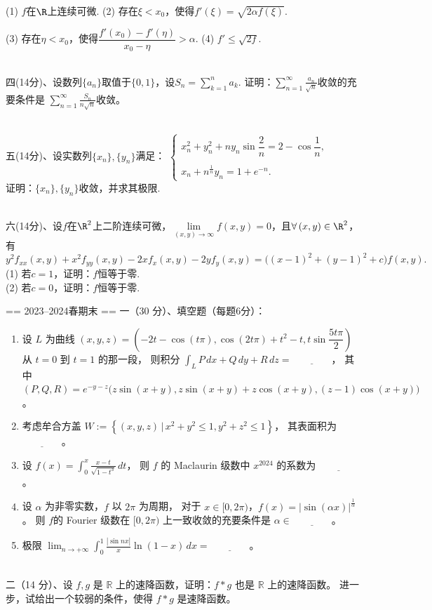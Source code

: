 (1) $f$在$\R$上连续可微.\qquad\qquad\qquad\qquad\qquad\quad
(2) 存在$\xi<x_0$，使得$f'(\xi)=\sqrt{2\alpha f(\xi)}$.

(3) 存在$\eta<x_0$，使得$\dfrac{f'(x_0)-f'(\eta)}{x_0-\eta}>\alpha$.\qquad
(4) $f'\leq\sqrt{2f}$.

~\\
四(14分)、设数列$\{a_n\}$取值于$\{0,1\}$，设$\displaystyle S_n=\sum_{k=1}^n a_k$.
证明：$\displaystyle\sum_{n=1}^\infty \frac{a_n}{\sqrt{n}}$收敛的充要条件是
$\displaystyle\sum\limits_{n=1}^\infty \frac{S_n}{n\sqrt{n}}$收敛。

~\\
五(14分)、设实数列$\{x_n\},\{y_n\}$满足：
$\begin{cases}
    x_n^2+y_n^2+ny_n\sin\dfrac2n=2-\cos\dfrac1n,\\ \\
    x_n+n^{\frac1n}y_n=1+e^{-n}.
\end{cases}$\\
证明：$\{x_n\},\{y_n\}$收敛，并求其极限.

~\\
六(14分)、设$f$在$\R^2$上二阶连续可微，$\lim\limits_{(x,y)\rightarrow\infty}f(x,y)=0$，且$\forall\,(x,y)\in\R^2$，有
$$y^2f_{xx}(x,y)+x^2f_{yy}(x,y)-2xf_{x}(x,y)-2yf_{y}(x,y)=\big((x-1)^2+(y-1)^2+c\big)f(x,y).$$
(1) 若$c=1$，证明：$f$恒等于零.\\
(2) 若$c=0$，证明：$f$恒等于零.

== 2023--2024春期末 ==
一（30 分）、填空题（每题6分）：
\begin{enumerate}[label=(\arabic*)]
\item 设 $L$ 为曲线 $(x, y, z)=\left(-2t-\cos(t\pi), \cos(2t\pi)+t^{2}-t, t \sin \dfrac{5t\pi}{2}\right)$ 从 $t=0$ 到 $t=1$ 的那一段，
则积分 $\displaystyle\int_{L} P \, dx+Q \, dy+R \, dz=\underline{\qquad\qquad}$，
其中 $(P, Q, R)=e^{-y-z}\big(z \sin (x+y), z \sin (x+y)+z \cos (x+y),(z-1) \cos (x+y)\big)$。
\item 考虑牟合方盖 $W:=\left\{(x, y, z) \,\big|\, x^{2}+y^{2} \leq 1, y^{2}+z^{2} \leq 1\right\}$，
其表面积为 $\underline{\qquad\qquad}$。
\item 设 $\displaystyle f(x)=\int_{0}^{x} \frac{x-t}{\sqrt{1-t^{3}}} \, dt$，
则 $f$ 的 Maclaurin 级数中 $x^{2024}$ 的系数为 $\underline{\qquad\qquad}$。
\item 设 $\alpha$ 为非零实数，$f$ 以 $2\pi$ 为周期，
对于 $x \in[0,2\pi)$，$f(x)=|\sin (\alpha x)|^{\frac{1}{\alpha}}$。
则 $f$的 Fourier 级数在 $[0,2\pi)$ 上一致收敛的充要条件是 $\alpha \in \underline{\qquad\qquad}$。
\item 极限 $\displaystyle\lim_{n \rightarrow+\infty} \int_{0}^{1} \frac{|\sin nx|}{x} \ln (1-x) \, dx=\underline{\qquad\qquad}$。
\end{enumerate}
~\\
二（14 分）、设 $f, g$ 是 $\mathbb{R}$ 上的速降函数，证明：$f * g$ 也是 $\mathbb{R}$ 上的速降函数。
进一步，试给出一个较弱的条件，使得 $f * g$ 是速降函数。

